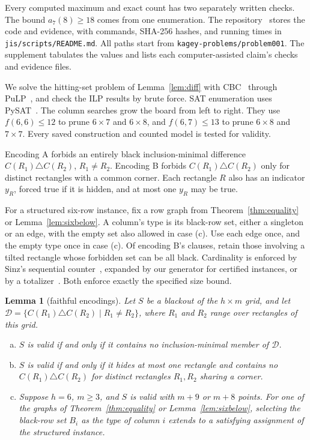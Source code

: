 \documentclass[12pt]{article}
\theoremstyle{plain}
\newtheorem{lemma}[theorem]{Lemma}
\theoremstyle{definition}
\theoremstyle{remark}
\begin{document}
Every computed maximum and exact count has two separately written checks.
The bound $a_7(8)\ge18$ comes from one enumeration. The repository~\cite{repo}
stores the code and evidence, with commands, SHA-256 hashes, and running times in
\nolinkurl{jis/scripts/README.md}. All paths start from
\nolinkurl{kagey-problems/problem001}. The supplement tabulates the values
and lists each computer-assisted claim's checks and evidence files.

We solve the hitting-set problem of Lemma~\ref{lem:diff} with
CBC~\cite{cbc} through PuLP~\cite{pulp}, and check the ILP results by brute force. SAT enumeration uses PySAT~\cite{pysat2018}.
The column searches grow the board from left to right. They use
$f(6,6)\le12$ to prune $6\times7$ and $6\times8$, and
$f(6,7)\le13$ to prune $6\times8$ and $7\times7$.
Every saved construction and counted model is tested for validity.

Encoding A forbids an entirely black inclusion-minimal difference
$C(R_1)\triangle C(R_2)$, $R_1\ne R_2$.
Encoding B forbids $C(R_1)\triangle C(R_2)$ only for distinct
rectangles with a common corner. Each rectangle $R$ also has an
indicator $y_R$, forced true if it is hidden, and at most one $y_R$
may be true.

For a structured six-row instance, fix a row graph from
Theorem~\ref{thm:equality} or Lemma~\ref{lem:sixbelow}. A column's type is
its black-row set, either a singleton or an edge, with the empty set also
allowed in case (c). Use each edge once, and the empty type once in case (c).
Of encoding B's clauses, retain those involving a tilted rectangle
whose forbidden set can be all black. Cardinality is enforced by
Sinz's sequential counter~\cite{sinz2005}, expanded by our generator
for certified instances, or by a totalizer~\cite{bailleux2003}.
Both enforce exactly the specified size bound.

\begin{lemma}[faithful encodings]\label{lem:enc}
Let $S$ be a blackout of the $h\times m$ grid, and let
$\mathcal D=\{C(R_1)\triangle C(R_2)\mid R_1\ne R_2\}$, where $R_1$ and $R_2$ range over
rectangles of this grid.
\begin{enumerate}[(a)]
\item $S$ is valid if and only if it contains no inclusion-minimal member of $\mathcal D$.
\item $S$ is valid if and only if it hides at most one rectangle and contains no
$C(R_1)\triangle C(R_2)$ for distinct rectangles $R_1,R_2$ sharing a corner.
\item Suppose $h=6$, $m\ge3$, and $S$ is valid with $m+9$ or $m+8$ points. For one of the
graphs of Theorem~\ref{thm:equality} or Lemma~\ref{lem:sixbelow}, selecting the black-row set
$B_i$ as the type of column $i$ extends to a satisfying assignment of the structured instance.
\end{enumerate}
\end{lemma}
\end{document}
